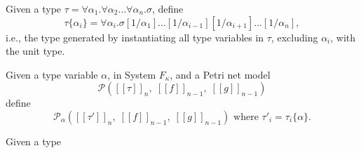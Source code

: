 \documentclass[../../Dissertation.tex]{subfiles}
\begin{document}
\begin{definition}\label{def:instantunit}
  Given a type $\tau = \forall \alpha_1.\forall \alpha_2\ldots\forall \alpha_n.\sigma$, define
  \begin{equation*}
    \tau\{\alpha_i\} = \forall \alpha_i.\sigma[1/\alpha_1]\ldots[1/\alpha_{i-1}][1/\alpha_{i+1}]\ldots[1/\alpha_n],
  \end{equation*}
  i.e., the type generated by instantiating all type variables in $\tau$, excluding $\alpha_i$, with the unit type.
\end{definition}

\begin{definition}
  Given a type variable $\alpha$, in System $F_\kappa$, and a Petri net model 
  \begin{equation*}
  \mathcal{P}([\![\tau]\!]_n,\; [\![f]\!]_{n-1},\; [\![g]\!]_{n-1})
  \end{equation*}
  define
  \begin{equation*}
    \mathcal{P}_\alpha([\![\tau']\!]_n,\; [\![f]\!]_{n-1},\; [\![g]\!]_{n-1}) \text{ where } \tau'_i = \tau_i\{\alpha\}.
  \end{equation*}
\end{definition}

\begin{example}
  Given a type 
\end{example}

\begin{remark}
\end{remark}
\end{document}
